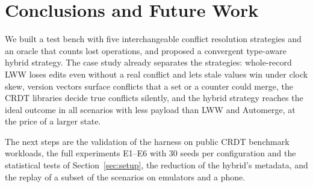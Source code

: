 \section{Conclusions and Future Work}\label{sec:conclusion}

We built a test bench with five interchangeable conflict resolution strategies and an oracle that counts lost
operations, and proposed a convergent type-aware hybrid strategy. The case study already separates the strategies: whole-record LWW loses edits even
without a real conflict and lets stale values win under clock skew, version vectors surface conflicts that a set or a
counter could merge, the CRDT libraries decide true conflicts silently, and the hybrid strategy reaches the ideal
outcome in all scenarios with less payload than LWW and Automerge, at the price of a larger state.

The next steps are the validation of the harness on public CRDT benchmark workloads, the full experiments E1--E6
with 30 seeds per configuration and the statistical tests of Section~\ref{sec:setup}, the reduction of the hybrid's
metadata, and the replay of a subset of the scenarios on emulators and a phone.

